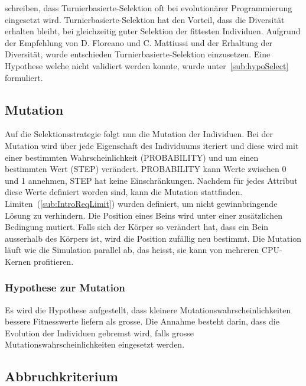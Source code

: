       \citet[S.33]{book:bioInspired} schreiben,
      dass Turnierbasierte-Selektion oft bei evolutionärer Programmierung eingesetzt wird.
      Turnierbasierte-Selektion hat den Vorteil, dass die Diversität erhalten bleibt,
      bei gleichzeitig guter Selektion der fittesten Individuen.
      Aufgrund der Empfehlung von D. Floreano und C. Mattiussi und der Erhaltung der Diversität,
      wurde entschieden Turnierbasierte-Selektion einzusetzen.
      Eine Hypothese welche nicht validiert werden konnte, wurde unter~\vref{sub:hypoSelect} formuliert.

    \subsection{Mutation\label{sec:Mutation}}

      Auf die Selektionsstrategie folgt nun die Mutation der Individuen.
      Bei der Mutation wird über jede Eigenschaft des Individuums iteriert und
      diese wird mit einer bestimmten Wahrscheinlichkeit (PROBABILITY) und um einen bestimmten Wert (STEP) verändert.
      PROBABILITY kann Werte zwischen 0 und 1 annehmen, STEP hat keine Einschränkungen.
      Nachdem für jedes Attribut diese Werte definiert worden sind, kann die Mutation stattfinden.
      Limiten~(\vref{sub:IntroReqLimit}) wurden definiert, um nicht gewinnbringende Lösung zu verhindern.
      Die Position eines Beins wird unter einer zusätzlichen Bedingung mutiert. Falls sich der Körper so verändert hat,
      dass ein Bein ausserhalb des Körpers ist, wird die Position zufällig neu bestimmt.
      Die Mutation läuft wie die Simulation parallel ab, das heisst, sie kann von mehreren CPU-Kernen profitieren.

      \subsubsection{Hypothese zur Mutation\label{subsub:hypoMut}}

        Es wird die Hypothese aufgestellt,
        dass kleinere Mutationswahrscheinlichkeiten bessere Fitnesswerte liefern als grosse.
        Die Annahme besteht darin, dass die Evolution der Individuen gebremst wird,
        falls grosse Mutationswahrscheinlichkeiten eingesetzt werden.

    \subsection{Abbruchkriterium}

